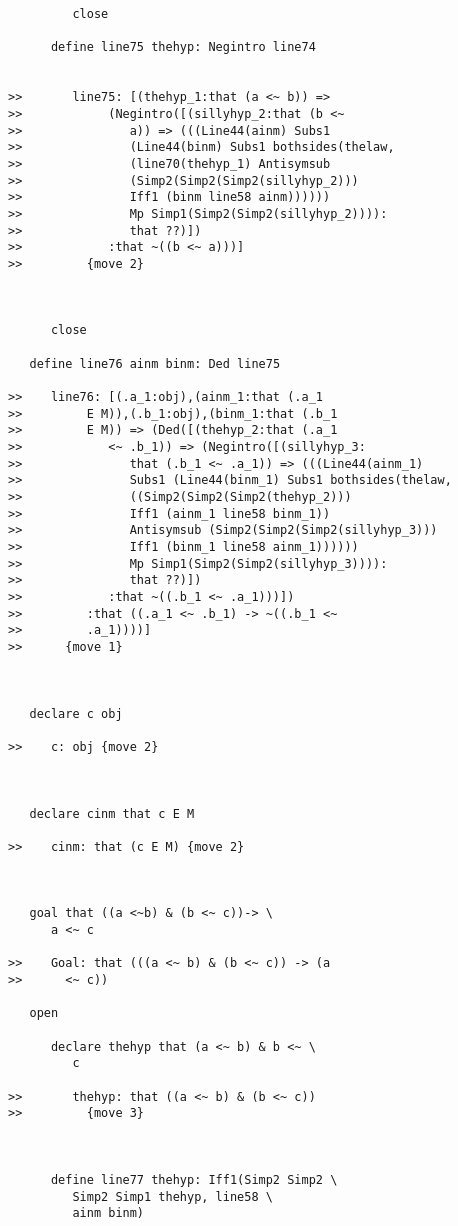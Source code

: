 \documentclass[12pt]{article}
\begin{document}
\begin{verbatim}
         close

      define line75 thehyp: Negintro line74


>>       line75: [(thehyp_1:that (a <~ b)) =>
>>            (Negintro([(sillyhyp_2:that (b <~
>>               a)) => (((Line44(ainm) Subs1
>>               (Line44(binm) Subs1 bothsides(thelaw,
>>               (line70(thehyp_1) Antisymsub
>>               (Simp2(Simp2(Simp2(sillyhyp_2)))
>>               Iff1 (binm line58 ainm))))))
>>               Mp Simp1(Simp2(Simp2(sillyhyp_2)))):
>>               that ??)])
>>            :that ~((b <~ a)))]
>>         {move 2}



      close

   define line76 ainm binm: Ded line75

>>    line76: [(.a_1:obj),(ainm_1:that (.a_1
>>         E M)),(.b_1:obj),(binm_1:that (.b_1
>>         E M)) => (Ded([(thehyp_2:that (.a_1
>>            <~ .b_1)) => (Negintro([(sillyhyp_3:
>>               that (.b_1 <~ .a_1)) => (((Line44(ainm_1)
>>               Subs1 (Line44(binm_1) Subs1 bothsides(thelaw,
>>               ((Simp2(Simp2(Simp2(thehyp_2)))
>>               Iff1 (ainm_1 line58 binm_1))
>>               Antisymsub (Simp2(Simp2(Simp2(sillyhyp_3)))
>>               Iff1 (binm_1 line58 ainm_1))))))
>>               Mp Simp1(Simp2(Simp2(sillyhyp_3)))):
>>               that ??)])
>>            :that ~((.b_1 <~ .a_1)))])
>>         :that ((.a_1 <~ .b_1) -> ~((.b_1 <~
>>         .a_1))))]
>>      {move 1}



   declare c obj

>>    c: obj {move 2}



   declare cinm that c E M

>>    cinm: that (c E M) {move 2}



   goal that ((a <~b) & (b <~ c))-> \
      a <~ c

>>    Goal: that (((a <~ b) & (b <~ c)) -> (a
>>      <~ c))

   open

      declare thehyp that (a <~ b) & b <~ \
         c

>>       thehyp: that ((a <~ b) & (b <~ c))
>>         {move 3}



      define line77 thehyp: Iff1(Simp2 Simp2 \
         Simp2 Simp1 thehyp, line58 \
         ainm binm)


\end{verbatim}
\end{document}

